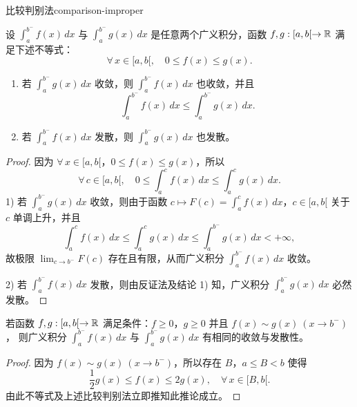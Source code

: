 \begin{mythm}{比较判别法}{comparison-improper}

设 $\displaystyle\int_a^{b^-}f(x)\,dx$ 与 $\displaystyle\int_a^{b^-}g(x)\,dx$ 是任意两个广义积分，函数 $f,g:[a,b[\to\mathbb{R}$ 满足下述不等式：
\[\forall\,x\in[a,b[,\quad 0\leqslant f(x)\leqslant g(x).\]
\begin{enumerate}[label=\arabic{enumi})]
\item 若 $\displaystyle\int_a^{b^-}g(x)\,dx$ 收敛，则 $\displaystyle\int_a^{b^-}f(x)\,dx$ 也收敛，并且
\[\int_a^{b^-}f(x)\,dx\leqslant\int_a^{b^-}g(x)\,dx.\]
\item 若 $\displaystyle\int_a^{b^-}f(x)\,dx$ 发散，则 $\displaystyle\int_a^{b^-}g(x)\,dx$ 也发散。
\end{enumerate}

\end{mythm}

\begin{proof}

因为 $\forall\,x\in[a,b[$，$0\leqslant f(x)\leqslant g(x)$，所以
\[\forall\,c\in[a,b[,\quad 0\leqslant\int_a^cf(x)\,dx\leqslant\int_a^cg(x)\,dx.\]
1) 若 $\displaystyle\int_a^{b^-}g(x)\,dx$ 收敛，则由于函数 $c\longmapsto F(c)=\displaystyle\int_a^cf(x)\,dx$，$c\in[a,b[$ 关于 $c$ 单调上升，并且
\[\int_a^cf(x)\,dx\leqslant\int_a^cg(x)\,dx\leqslant\int_a^{b^-}g(x)\,dx<+\infty,\]
故极限 $\displaystyle\lim_{c\to b^-}F(c)$ 存在且有限，从而广义积分 $\displaystyle\int_a^{b^-}f(x)\,dx$ 收敛。

2) 若 $\displaystyle\int_a^{b^-}f(x)\,dx$ 发散，则由反证法及结论 1) 知，广义积分 $\displaystyle\int_a^{b^-}g(x)\,dx$ 必然发散。

\end{proof}

\begin{mycor*}{}

若函数 $f,g:[a,b[\to\mathbb{R}$ 满足条件：$f\geqslant0$，$g\geqslant0$ 并且 $f(x)\sim g(x)\ (x\to b^-)$，
则广义积分 $\displaystyle\int_a^{b^-}f(x)\,dx$ 与 $\displaystyle\int_a^{b^-}g(x)\,dx$ 有相同的收敛与发散性。

\end{mycor*}

\begin{proof}

因为 $f(x)\sim g(x)\ (x\to b^-)$，所以存在 $B$，$a\leqslant B<b$ 使得
\[\frac{1}{2}g(x)\leqslant f(x)\leqslant2g(x),\quad\forall\,x\in[B,b[.\]
由此不等式及上述比较判别法立即推知此推论成立。

\end{proof}

